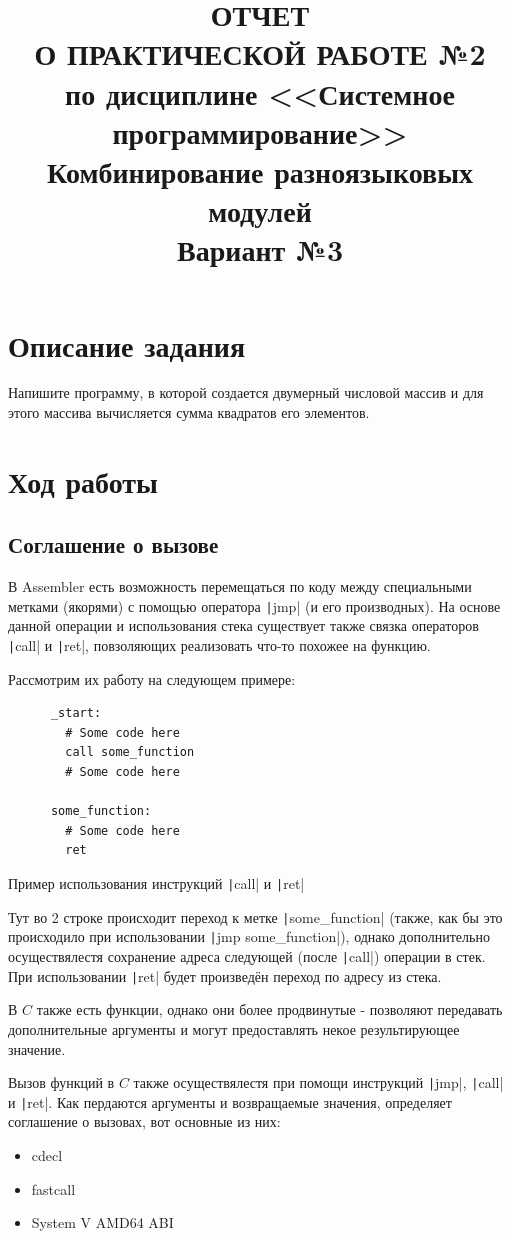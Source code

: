 \documentclass[a4paper]{article}
\title{
  ОТЧЕТ \\
  О ПРАКТИЧЕСКОЙ РАБОТЕ №2 \\
  по дисциплине <<Системное программирование>> \\
  Комбинирование разноязыковых модулей \\
  Вариант №3
}
\begin{document}
  \templatedtitlepage
  
  \toc

  \section{Описание задания}

  Напишите программу, в которой создается двумерный числовой массив и для этого массива вычисляется сумма
  квадратов его элементов.

  \newpage
  \section{Ход работы}

  \subsection{Соглашение о вызове}

  В Assembler есть возможность перемещаться по коду между специальными
  метками (якорями) с помощью оператора \texttt|jmp| (и его производных). На основе
  данной операции и использования стека существует также связка операторов
  \texttt|call| и \texttt|ret|, повзоляющих реализовать что-то похожее на функцию.
  
  Рассмотрим их работу на следующем примере:
  \begin{listing}[H]
    \begin{verbatim}
      _start:
        # Some code here
        call some_function
        # Some code here

      some_function:
        # Some code here
        ret
    \end{verbatim}
    \caption{Пример использования инструкций \texttt|call| и \texttt|ret|}
  \end{listing}

  Тут во 2 строке происходит переход к метке \texttt|some_function|
  (также, как бы это происходило при использовании \texttt|jmp some_function|),
  однако дополнительно осуществялестя сохранение адреса следующей (после \texttt|call|) операции
  в стек. При использовании \texttt|ret| будет произведён переход
  по адресу из стека.

  В $C$ также есть функции, однако они более продвинутые - позволяют
  передавать дополнительные аргументы и могут предоставлять некое результирующее
  значение.
  
  Вызов функций в $C$ также осуществялестя при помощи инструкций
  \texttt|jmp|, \texttt|call| и \texttt|ret|.
  Как пердаются аргументы и возвращаемые значения, определяет соглашение о вызовах,
  вот основные из них:
  \begin{itemize}
    \item cdecl
    \item fastcall
    \item System V AMD64 ABI
  \end{itemize}
\end{document}
